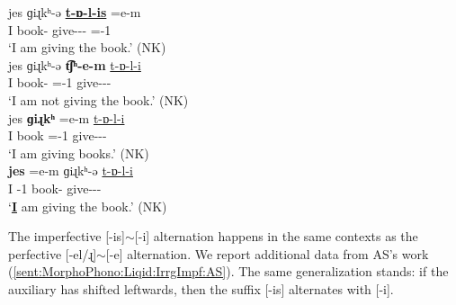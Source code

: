 \begin{exe}
	\ex \label{sent:MorphoPhono:Liqid:IrrgImpf:ex}
	\begin{xlist}
		\ex \gll jes  ɡiɻkʰ-ə  \uline{\textbf{t-ɒ-l-is}}  \colorbox{lsLightGray}{=e-m}
		\\
		I  book-{}  give-{\thgloss}-{\infgloss}-{\impfcvb}  ={\auxgloss}-1{\sg}
		\\
		\trans `I am giving the book.' \hfill (NK)
		\\
		\ex \gll jes  ɡiɻkʰ-ə \textbf{t͡ʃʰ\colorbox{lsLightGray}{-e-m}}  \uline{{t-ɒ-l-i}}  
		\\
		I  book-{}    {\neggloss}={\auxgloss}-1{\sg} give-{\thgloss}-{\infgloss}-{\impfcvb}
		\\
		\trans `I am not giving  the book.' \hfill (NK)
		\\
		\ex \gll jes  \textbf{ɡiɻkʰ} \colorbox{lsLightGray}{=e-m}  \uline{{t-ɒ-l-i}}  
		\\
		I  book    ={\auxgloss}-1{\sg} give-{\thgloss}-{\infgloss}-{\impfcvb}
		\\
		\trans `I am giving  books.'   \hfill (NK)
		\\
		\ex \gll \textbf{jes} \colorbox{lsLightGray}{=e-m}  ɡiɻkʰ-ə     \uline{{t-ɒ-l-i}}  
		\\
		I  {\auxgloss}-1{\sg} book-{}   give-{\thgloss}-{\infgloss}-{\impfcvb}
		\\
		\trans `\textbf{\uline{I}} am  giving  the book.' \hfill (NK)
		\\
	\end{xlist}
\end{exe}

The imperfective [-is]$\sim$[-i] alternation happens in the same contexts as the perfective [-el/ɻ]$\sim$[-e] alternation. 	We report additional data from AS's work (\ref{sent:MorphoPhono:Liqid:IrrgImpf:AS}). The same generalization stands: if the auxiliary has shifted leftwards, then the suffix [-is] alternates with [-i].

